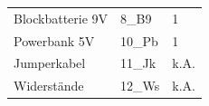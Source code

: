 \documentclass[12pt,a4paper,oneside]{article}
\begin{document}
\begin{spacing}{1.15}
\begin{table}[h]
\begin{tabular}{lll}
		Blockbatterie 9V                                                  & 8\_B9                                                           & 1                                                                                                                                         \\
		Powerbank 5V                                                      & 10\_Pb                                                          & 1                                                                                                                                        \\
		Jumperkabel                                                       & 11\_Jk                                                          & k.A.                                                                                                                          \\
		Widerstände                                                       & 12\_Ws                                                          & k.A.                                                                                                             
	\end{tabular}
\end{table}







\end{spacing}
\end{document}

